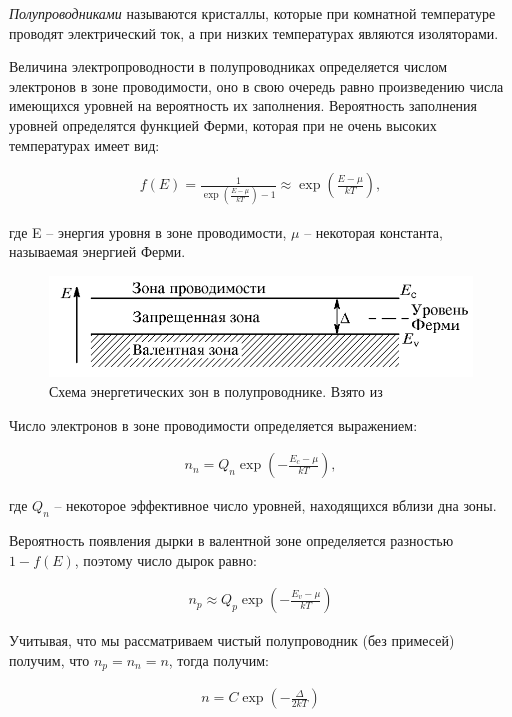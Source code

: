 \documentclass[a4paper,12pt]{article}
\begin{document}
\textit{Полупроводниками} называются кристаллы, которые при комнатной температуре проводят электрический ток, а при низких температурах являются изоляторами.

Величина электропроводности в полупроводниках определяется числом электронов в зоне проводимости, оно в свою очередь равно произведению числа имеющихся уровней на вероятность их заполнения. Вероятность заполнения уровней определятся функцией Ферми, которая при не очень высоких температурах имеет вид:

\begin{align}
	f(E) = \frac{1}{\exp \left( \frac{E - \mu }{kT}\right) - 1} \approx \exp \left( \frac{E - \mu }{kT}\right),
\end{align}

где E -- энергия уровня в зоне проводимости, $\mu$ -- некоторая константа, называемая энергией Ферми.

\begin{figure}[h!]
	\centering
	\includegraphics[width=0.8\linewidth]{semiconductor}
	\caption{Схема энергетических зон в полупроводнике. Взято из \cite{lab}}
\end{figure}

Число электронов в зоне проводимости определяется выражением:

\begin{align}
	n_n = Q_n \exp \left( - \frac{E_c - \mu}{kT} \right),
\end{align}

где $Q_n$ -- некоторое эффективное число уровней, находящихся вблизи дна зоны.

Вероятность появления дырки в валентной зоне определяется разностью $1 - f(E)$, поэтому число дырок равно:

\begin{align}
	n_p \approx Q_p \exp \left( - \frac{E_v - \mu}{kT} \right)
\end{align}

Учитывая, что мы рассматриваем чистый полупроводник (без примесей) получим, что $n_p = n_n =n$, тогда получим:

\begin{align} \label{eq4:number_of_electrons}
	n = C \exp \left( - \frac{\Delta}{2kT} \right)
\end{align}
\end{document}
